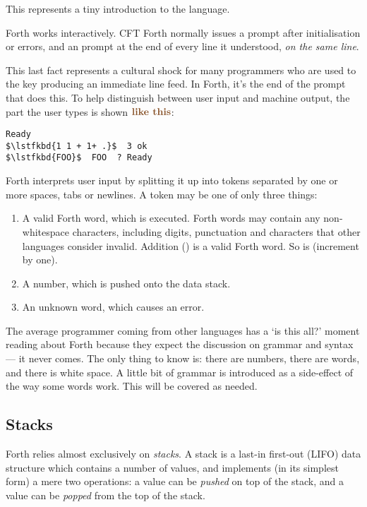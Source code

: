 This represents a tiny introduction to the language.

Forth works interactively. CFT Forth normally issues a  prompt
after initialisation or errors, and an  prompt at the end of every
line it understood, {\em on the same line}.

This last fact represents a cultural shock for many programmers who are used to
the  key producing an immediate line feed. In Forth, it's the end
of the  prompt that does this. To help distinguish between user
input and machine output, the part the user types is shown $\lstfkbd{like this}$:

\begin{lstlisting}[mathescape=true,numbers=none]
Ready
$\lstfkbd{1 1 + 1+ .}$  3 ok
$\lstfkbd{FOO}$  FOO  ? Ready
\end{lstlisting}

\noindent Forth interprets user input by splitting it up into tokens separated
by one or more spaces, tabs or newlines. A token may be one of only
three things:

\begin{enumerate}
\item A valid Forth word, which is executed. Forth words may contain
  any non-whitespace characters, including digits, punctuation and
  characters that other languages consider invalid. Addition (\fw{+})
  is a valid Forth word. So is  (increment by one).
\item A number, which is pushed onto the \gls{data stack}.
\item An unknown word, which causes an error.
\end{enumerate}

The average programmer coming from other languages has a ‘is this all?’ moment
reading about Forth because they expect the discussion on grammar and syntax —
it never comes. The only thing to know is: there are numbers, there are words,
and there is white space. A little bit of grammar is introduced as a
side-effect of the way some words work. This will be covered as needed.

\subsection{Stacks}

Forth relies almost exclusively on {\em stacks}. A stack is a last-in first-out
(LIFO) data structure which contains a number of values, and implements (in its
simplest form) a mere two operations: a value can be {\em pushed\/} on top of
the stack, and a value can be {\em popped\/} from the top of the stack.

